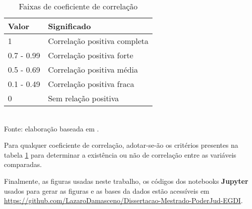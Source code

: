 \begin{table}[H]
	\centering
	\label{tab:faixas-coeficiente-correlacao}
	\caption{Faixas de coeficiente de correlação}
	\begin{tabular}{@{}lp{6cm}@{}}
		\toprule
		\textbf{Valor} & \textbf{Significado} \\ \midrule
		1          & Correlação positiva completa \\ \midrule
		0.7 - 0.99 & Correlação positiva forte    \\ \midrule
		0.5 - 0.69 & Correlação positiva média    \\ \midrule
		0.1 - 0.49 & Correlação positiva fraca    \\ \midrule
		0          & Sem relação positiva         \\ \bottomrule
	\end{tabular}
	\\ \footnotesize{Fonte: elaboração baseada em \cite{ali2022spearman}.}
\end{table}

Para qualquer coeficiente de correlação, adotar-se-ão os critérios presentes na tabela \ref{tab:faixas-coeficiente-correlacao} para determinar a existência ou não de correlação entre as variáveis comparadas.

Finalmente, as figuras usadas neste trabalho, os códigos dos notebooks \textbf{Jupyter} usados para gerar as figuras e as bases da dados estão acessíveis em \url{https://github.com/LazaroDamasceno/Dissertacao-Mestrado-PoderJud-EGDI}.